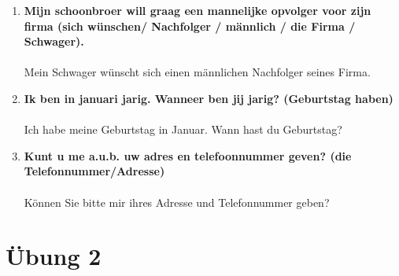 \documentclass[main.tex]{subfiles}
\begin{document}
\begin{enumerate}
\\
\item \textbf{Mijn schoonbroer will graag een mannelijke opvolger voor zijn firma (sich wünschen/ Nachfolger / männlich / die Firma / Schwager).}\\ \\
Mein Schwager wünscht sich einen männlichen Nachfolger seines Firma.
\\
\item \textbf{Ik ben in januari jarig. Wanneer ben jij jarig? (Geburtstag haben)} \\ \\
Ich habe meine Geburtstag in Januar. Wann hast du Geburtstag?
\\
\item \textbf{Kunt u me a.u.b. uw adres en telefoonnummer geven? (die Telefonnummer/Adresse)} \\ \\
Können Sie bitte mir ihres Adresse und Telefonnummer geben?

\end{enumerate}
\pagebreak
\section{Übung 2}
\end{document}
